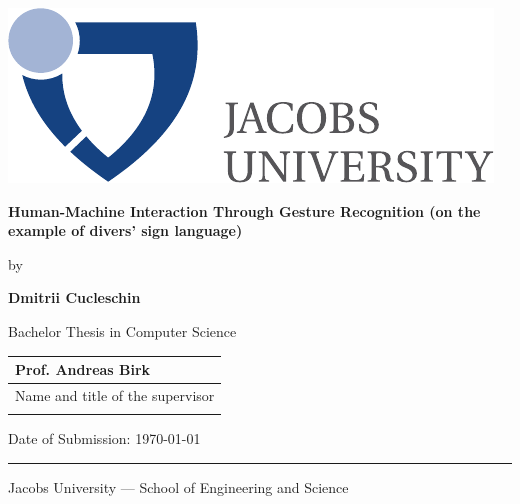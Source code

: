 \documentclass[a4paper,11pt,oneside]{article}
\newcommand{\myname}{Dmitrii Cucleschin}
\newcommand{\mytitle}{Human-Machine Interaction Through Gesture Recognition (on the example of divers' sign language)}
\newcommand{\mysupervisor}{Prof. Andreas Birk}
\begin{document}

  \thispagestyle{empty}

  \begin{flushright}
    \includegraphics[scale=0.7]{bsc-logo}
  \end{flushright}
  \vspace{20mm}
  \begin{center}
    \huge
    \textbf{\mytitle}
  \end{center}
  \vspace*{4mm}
  \begin{center}
   \Large by
  \end{center}
  \vspace*{4mm}
  \begin{center}
    \Large
    \textbf{\myname}
  \end{center}
  \vspace*{20mm}
  \begin{center}
    \large
    Bachelor Thesis in Computer Science
  \end{center}
  \vfill
  \begin{flushright}
    \large
    \begin{tabular}{l}
      \mysupervisor \\
      \hline
      Name and title of the supervisor \\
      \\
    \end{tabular}
  \end{flushright}
  \vspace*{8mm}
  \begin{flushleft}
    \large
    Date of Submission: \today \\
    \rule{\textwidth}{1pt}
  \end{flushleft}
  \begin{center}
    \Large Jacobs University --- School of Engineering and Science
  \end{center}

  \newpage
  \thispagestyle{empty}
\end{document}
